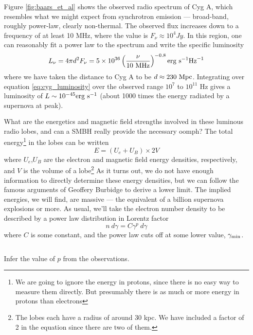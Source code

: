 \documentclass[11pt]{article}
\begin{document}
Figure \ref{fig:baars_et_al} shows the observed radio spectrum of Cyg A, which
resembles what we might expect from synchrotron emission --- broad-band, roughly
power-law, clearly non-thermal. The observed flux increases down to a frequency
of at least 10 MHz, where the value is
$F_\nu\approx10^4 Jy$.  In this region, one can reasonably fit a power law to
the spectrum and write the specific luminosity
\begin{equation}
L_\nu=4\pi d^2F_\nu=5\times 10^{36}\left(\frac{\nu}{10~{\rm MHz}}\right)^{-0.8} {\rm erg~s}^{-1}{\rm Hz}^{-1}
\label{eq:cyg_luminosity}
\end{equation}
where we have taken the distance to Cyg A to be $d\approx230~{\rm Mpc}$.  Integrating over
equation \ref{eq:cyg_luminosity} over the observed range $10^7$ to $10^{11}$ Hz gives a luminosity
of $L\sim10^{-45}{\rm erg~s}^{-1}$ (about 1000 times the energy radiated by a supernova at peak).

What are the energetics and magnetic field strengths involved in these luminous
radio lobes, and can a SMBH really provide the necessary oomph? The total
energy\footnote{We are going to ignore the energy in protons, since there is no 
easy way to measure them directly. But presumably there is as much or more 
energy in protons than electrons}
in the lobes can be written
\begin{equation}
E=(U_e+U_B)\times 2V
\end{equation}
where $U_e$,$U_B$ are the electron and magnetic field energy densities, respectively,
and $V$ is the volume of a lobe\footnote{The lobes each have a radius of around 30 kpc. 
We have included a factor of 2 in the equation since there are two of them.}
As it turns out, we do not have enough information to directly determine these energy densities, but 
we can follow the famous arguments of Geoffery Burbidge to derive a lower limit. The implied 
energies, we will find, are massive --- the equivalent of a billion supernova explosions or more.
As usual, we’ll take the electron number density to be described by a power law distribution in 
Lorentz factor
\begin{equation}
n~d\gamma=C\gamma^p~d\gamma
\label{eq:gamma_plaw}
\end{equation}
where $C$ is some constant, and the power law cuts off at some lower value, $\gamma_{\rm min}$.

\subsection{}
Infer the value of $p$ from the observations.
\end{document}
